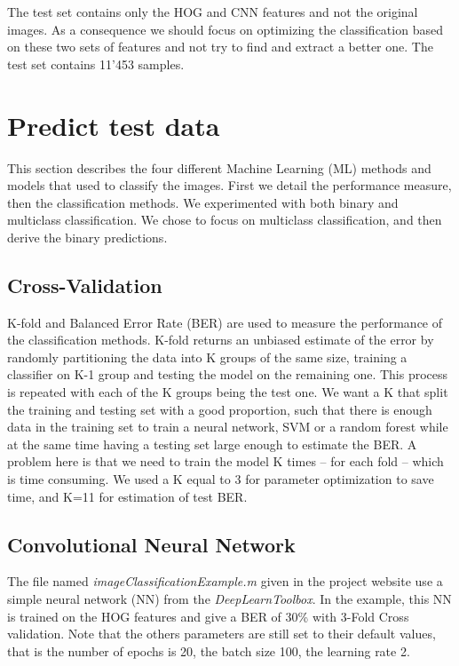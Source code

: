 \documentclass{article} %
\begin{document}
The test set contains only the HOG and CNN features and not the original images.
As a consequence we should focus on optimizing the classification based on these two sets of features and not try to find and extract a better one.
The test set contains 11'453 samples.

\section{Predict test data}

This section describes the four different Machine Learning (ML) methods and models that used to classify the images. 
First we detail the performance measure, then the classification methods.
We experimented with both binary and multiclass classification.
We chose to focus on multiclass classification, and then derive the binary predictions.


\subsection{Cross-Validation}

K-fold and Balanced Error Rate (BER) are used to measure the performance of the classification methods.
K-fold returns an unbiased estimate of the error by randomly partitioning the data into K groups of the same size, training a classifier on K-1 group and testing the model on the remaining one. This process is repeated with each of the K groups being the test one.
We want a K that split the training and testing set with a good proportion, such that there is enough data in the training set to train a neural network, SVM or a random forest while at the same time having a testing set large enough to estimate the BER.
A problem here is that we need to train the model K times -- for each fold -- which is time consuming. 
We used a K equal to 3 for parameter optimization to save time, and K=11 for estimation of test BER.

\subsection{Convolutional Neural Network}
The file named \emph{imageClassificationExample.m} given in the project website use a simple neural network (NN) from the \emph{DeepLearnToolbox}.
In the example, this NN is trained on the HOG features and give a BER of 30\% with 3-Fold Cross validation. Note that the others parameters are still set to their default values, that is the number of epochs is 20, the batch size 100, the learning rate 2.
\end{document}
